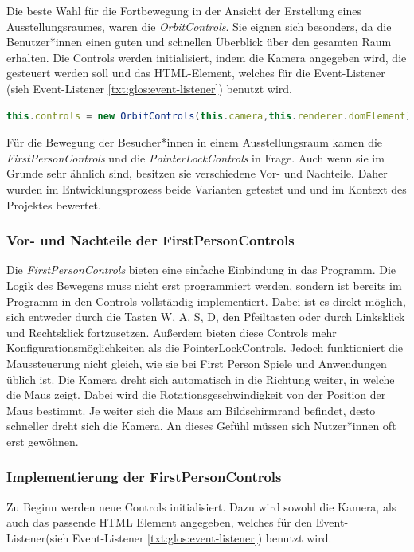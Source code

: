 Die beste Wahl für die Fortbewegung in der Ansicht der Erstellung eines Ausstellungsraumes, waren die \emph{OrbitControls}. Sie eignen sich besonders, da die Benutzer*innen einen guten und schnellen Überblick über den gesamten Raum erhalten.
Die Controls werden initialisiert, indem die Kamera angegeben wird, die gesteuert werden soll und das HTML-Element, welches für die Event-Listener (sieh Event-Listener \ref{txt:glos:event-listener}) benutzt wird.

\begin{lstlisting}[caption={OrbitControls initialisieren},language=TypeScript]
    this.controls = new OrbitControls(this.camera,this.renderer.domElement)
    \end{lstlisting}

Für die Bewegung der Besucher*innen in einem Ausstellungsraum kamen die \emph{FirstPersonControls} und die \emph{PointerLockControls} in Frage. Auch wenn sie im Grunde sehr ähnlich sind, besitzen sie verschiedene Vor- und Nachteile. Daher wurden im Entwicklungsprozess beide Varianten getestet und und im Kontext des Projektes bewertet.

\subsubsection{Vor- und Nachteile der FirstPersonControls}

Die \emph{FirstPersonControls} bieten eine einfache Einbindung in das Programm. Die Logik des Bewegens muss nicht erst programmiert werden, sondern ist bereits im Programm in den Controls vollständig implementiert. Dabei ist es direkt möglich, sich entweder durch die Tasten W, A, S, D, den Pfeiltasten oder durch Linksklick und Rechtsklick fortzusetzen. Außerdem bieten diese Controls mehr Konfigurationsmöglichkeiten als die PointerLockControls. Jedoch funktioniert die Maussteuerung nicht gleich, wie sie bei First Person Spiele und Anwendungen üblich ist. Die Kamera dreht sich automatisch in die Richtung weiter, in welche die Maus zeigt. Dabei wird die Rotationsgeschwindigkeit von der Position der Maus bestimmt. Je weiter sich die Maus am Bildschirmrand befindet, desto schneller dreht sich die Kamera. An dieses Gefühl müssen sich Nutzer*innen oft erst gewöhnen.

\subsubsection{Implementierung der FirstPersonControls}
Zu Beginn werden neue Controls initialisiert. Dazu wird sowohl die Kamera, als auch das passende HTML Element angegeben, welches für den Event-Listener(sieh Event-Listener \ref{txt:glos:event-listener}) benutzt wird. 

